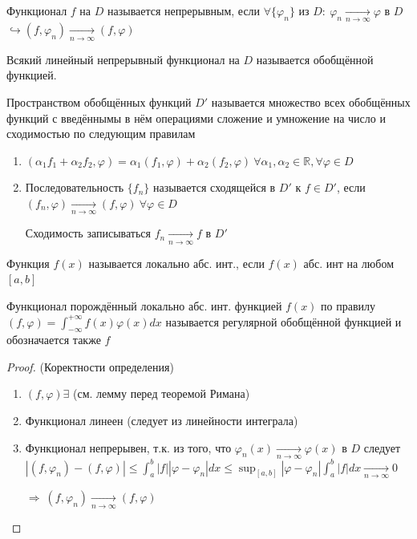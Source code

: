 \documentclass{article}
\theoremstyle{definition}
\numberwithin{theorem}{section}
\numberwithin{lemma}{section}
\numberwithin{definition}{section}
\numberwithin{corollary}{section}
\numberwithin{equation}{section}
\let\phi\varphi
\let\implies\Rightarrow
\let\true\hookrightarrow
\newcommand\R{\ensuremath{\mathbb{R}}}
\begin{document}
\begin{definition}
  Функционал $f$ на $D$ называется непрерывным, если $\forall \{\phi_n\}$ из $D: \ \phi_n \underset{n\to \infty}{\to}\phi$ в $D$
  $\true (f,\phi_n) \underset{ n \to \infty}{\to }(f,\phi)$
\end{definition}
\begin{definition}
  Всякий линейный непрерывный функционал на $D$ называется обобщённой функцией.
\end{definition}
\begin{definition}
  Пространством обобщённых функций $D'$ называется множество всех обобщённых функций
  с введённымы в нём операциями сложение и умножение на число и сходимостью по следующим правилам
  \begin{enumerate}
    \item $(\alpha_1f_1+\alpha_2f_2,\phi)=\alpha_1(f_1,\phi)+\alpha_2(f_2,\phi)\ \forall \alpha_1,\alpha_2 \in \R, \forall \phi \in D$
    \item Последовательность $\{f_n\}$ называется сходящейся в $D'$ к $f\in D'$, если
      $(f_n,\phi)\underset{n\to \infty}{\to}(f,\phi) \ \forall \phi\in D$

      Сходимость записываться $f_n \underset{n\to \infty}{\to }f $ в $D'$
  \end{enumerate}
\end{definition}
\begin{definition}
  Функция $f(x)$ называется локально абс. инт., если $f(x)$ абс. инт на любом $[a,b]$
\end{definition}
\begin{definition}
  Функционал порождённый локально абс. инт. функцией $f(x)$ по правилу 
  $(f,\phi)=\int_{-\infty}^{+\infty}f(x)\phi(x)dx$ называется регулярной обобщённой функцией
  и обозначается также $f$
\end{definition}
\begin{proof}(Коректности определения)
  \begin{enumerate}
    \item $(f,\phi)\exists$ (см. лемму перед теоремой Римана)
    \item Функционал линеен (следует из линейности интеграла)
    \item Функционал непрерывен, т.к. из того, что $\phi_n(x)\underset{n\to\infty}{\to}\phi(x)$ в $D$
      следует $|(f,\phi_n)-(f,\phi)|\le \int_{a}^{b}|f||\phi-\phi_n|dx \le \sup_{[a,b]}|\phi-\phi_n|\int_{a}^{b}|f|dx \underset{n\to\infty}{\to}0$

      $\implies \ (f,\phi_n) \underset{ n\to\infty}{\to}(f,\phi)$
  \end{enumerate}
\end{proof}
\end{document}
